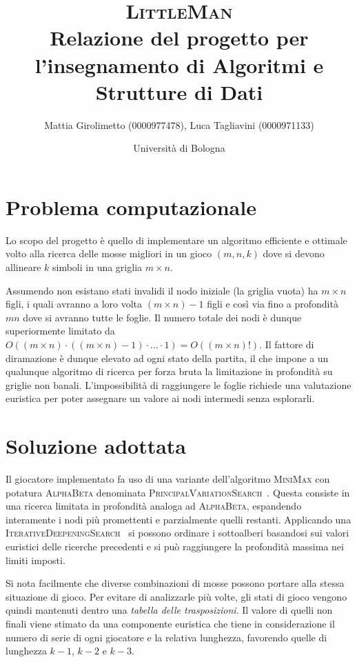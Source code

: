 \documentclass{article}
\title{\textsc{LittleMan}\\
\large Relazione del progetto per l'insegnamento di Algoritmi e Strutture di Dati}
\author{
  Mattia Girolimetto (0000977478),
  Luca Tagliavini (0000971133)
}
\date{
	Universit\`a di Bologna \\
  \displaydate{date}
}
\begin{document}
\maketitle
\pagebreak
\tableofcontents
\pagebreak

\section{Problema computazionale}

Lo scopo del progetto \`e quello di implementare un algoritmo efficiente e ottimale
volto alla ricerca delle mosse migliori in un gioco $(m,n,k)$ dove si devono
allineare $k$ simboli in una griglia $m \times n$.

Assumendo non esistano stati invalidi il nodo iniziale (la griglia vuota)
ha $m \times n$ figli, i quali avranno a loro volta $(m \times n)-1$ figli e cos\`i
via fino a profondit\`a $mn$ dove si avranno tutte le foglie. Il numero totale
dei nodi \`e dunque superiormente limitato da $O((m \times n) \cdot ((m \times n)-1)
\cdot \ldots \cdot 1) = O((m \times n)!)$.
Il fattore di diramazione \`e dunque elevato ad ogni stato della partita, il che
impone a un qualunque algoritmo di ricerca per forza bruta la limitazione in
profondit\`a su griglie non banali. L'impossibilit\`a di raggiungere le foglie
richiede una valutazione euristica per poter assegnare un valore ai nodi intermedi
senza esplorarli.

\section{Soluzione adottata}

Il giocatore implementato fa uso di una variante dell'algoritmo \textsc{MiniMax} con potatura
\textsc{AlphaBeta} denominata \textsc{PrincipalVariationSearch}~\cite{negascout}. Questa
consiste in una ricerca limitata in profondit\`a analoga ad \textsc{AlphaBeta}, espandendo 
interamente i nodi pi\`u promettenti e parzialmente quelli restanti. Applicando
una \textsc{IterativeDeepeningSearch}~\cite{id} si possono ordinare i sottoalberi
basandosi sui valori euristici delle ricerche precedenti e si pu\`o raggiungere
la profondit\`a massima nei limiti imposti.

Si nota facilmente che diverse combinazioni di mosse possono portare alla stessa 
situazione di gioco.
Per evitare di analizzarle pi\`u volte, gli stati di gioco vengono quindi mantenuti 
dentro una \emph{tabella delle trasposizioni}. Il valore di quelli non finali
viene stimato da una componente euristica che tiene in considerazione il numero
di serie di ogni giocatore e la relativa lunghezza, favorendo quelle di lunghezza
$k-1$, $k-2$ e $k-3$.
\end{document}
